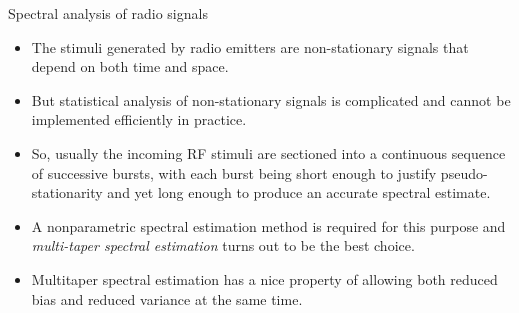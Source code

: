 \documentclass[mathserif]{beamer}
\begin{document}
%
%
%
\begin{frame}{Spectral analysis of radio signals}


\begin{itemize}

	\pause
	\item The stimuli generated by radio emitters are non-stationary signals that depend on both time and space.
	\pause
	\item But statistical analysis of non-stationary signals is complicated and cannot be implemented efficiently in practice. 
	\pause
	\item So, usually the incoming RF stimuli are sectioned into a continuous sequence of successive bursts, with each burst being short enough to justify pseudo-stationarity and yet long enough to produce an accurate spectral estimate.
	\pause
	\item A nonparametric spectral estimation method is required for this purpose and \emph{multi-taper spectral estimation} turns out to be the best choice. 
	\pause
	\item Multitaper spectral estimation has a nice property of allowing both reduced bias and reduced variance at the same time.

\end{itemize}
\end{frame}
\end{document}
